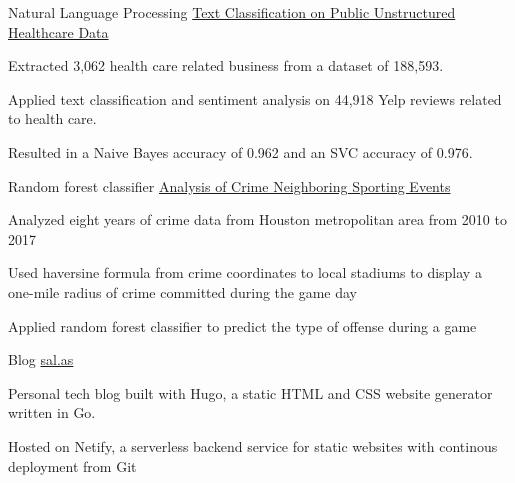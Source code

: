 

\begin{cventries}
	
	\cventrynodate
	{Natural Language Processing} %
	{\href{https://github.com/franksalas/text_classification_public_healthcare_data}{Text Classification on Public Unstructured Healthcare Data}}
	{} %
	{}
	{
		\begin{cvitems} %
			\item {Extracted 3,062 health care related business from a dataset of 188,593.}
			\item {Applied text classification and sentiment analysis on  44,918 Yelp reviews related to health care.}
			\item {Resulted in a Naive Bayes accuracy of 0.962 and an SVC accuracy of 0.976.}
		\end{cvitems}
	}
	
	
	
	\cventrynodate
	{Random forest classifier} %
	{\href{https://github.com/franksalas/SpringboardCapstone}{Analysis of Crime Neighboring Sporting Events}} %
	{} %
	{} %
	{
		\begin{cvitems} %
			\item {Analyzed eight years of crime data from Houston metropolitan area from 2010 to 2017}
			\item {Used haversine formula from crime coordinates to local stadiums to display a one-mile radius of crime committed during the game day}
			\item {Applied random forest classifier to predict the type of offense during a game}
		\end{cvitems}
	}
	
	\cventrynodate
	{Blog} %
	{\href{https://github.com/franksalas/blog}{sal.as}} %
	{} %
	{} %
	{
		\begin{cvitems} %
			\item {Personal tech blog built with Hugo, a static HTML and CSS website generator written in Go.}
			\item {Hosted on Netify, a serverless backend service for static websites with continous deployment from Git}
		\end{cvitems}
	}
	\vspace*{-6mm}
\end{cventries}
